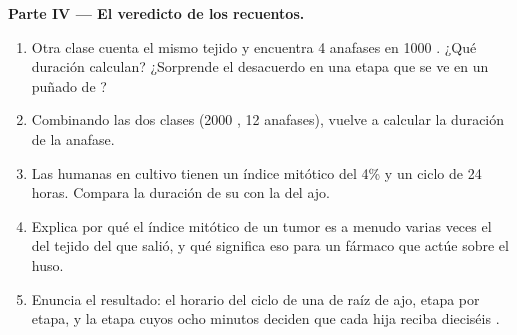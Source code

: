 \begin{problem}
\medskip
\noindent\textbf{Parte IV --- El veredicto de los recuentos.}
\begin{enumerate}[resume]
  \item Otra clase cuenta el mismo tejido y encuentra 4 anafases en
        1000 . ¿Qué duración calculan? ¿Sorprende el desacuerdo
        en una etapa que se ve en un puñado de ?
  \item Combinando las dos clases (2000 , 12 anafases), vuelve a
        calcular la duración de la anafase.
  \item Las  humanas en cultivo tienen un índice mitótico del
        4\% y un ciclo de 24 horas. Compara la duración de su 
        con la del ajo.
  \item Explica por qué el índice mitótico de un tumor es a menudo
        varias veces el del tejido del que salió, y qué significa eso
        para un fármaco que actúe sobre el huso.
  \item Enuncia el resultado: el horario del ciclo de una  de
        raíz de ajo, etapa por etapa, y la etapa cuyos ocho minutos
        deciden que cada hija reciba dieciséis .
\end{enumerate}
\end{problem}
